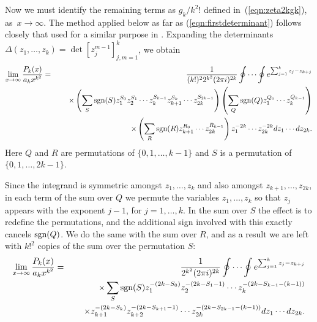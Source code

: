 \documentclass[12pt,letterpaper]{amsart}
\theoremstyle{plain}
\theoremstyle{definition}
\theoremstyle{remark}
\numberwithin{equation}{subsection}
\numberwithin{theorem}{subsection}
\numberwithin{table}{subsection}
\def\sgn{\hbox{sgn}}
\begin{document}
Now we must identify the remaining terms as
$g_k/k^2 !$ defined in~(\ref{eqn:zeta2kgk}), as~$x\to\infty$.
The method applied below as far as (\ref{eqn:firstdeterminant})
follows closely that used for a similar purpose in \cite{BH}.
Expanding the determinants
$\Delta(z_1,\ldots,z_k)=\det[z_j^{m-1}]_{j,m=1}^k$, we obtain
\begin{eqnarray}
\lim_{x\rightarrow \infty}\frac{P_k(x)}{a_k{x}^{k^2}}&  =
&\frac{1} {(k!)^2 2^{k^2} (2\pi i)^{2k}} \oint \cdots  \oint
e^{\sum_{j=1}^k z_j-z_{k+j}} \nonumber \\&   &\ \ \ \ \times\left(
\sum_S \sgn(S) z_1^{S_0}z_2^{S_1} \cdots z_k^{S_{k-1}}
z_{k+1}^{S_k} \cdots z_{2k}^{S_{2k-1}} \right) \left( \sum_Q
\sgn(Q) z_1^{Q_0}\cdots z_k^{Q_{k-1}} \right)\nonumber \\&   &\ \
\ \ \times\left( \sum_R \sgn(R) z_{k+1}^{R_0}\cdots
z_{2k}^{R_{k-1}} \right) z_1^{-2k}\cdots z_{2k}^{-2k} dz_1\cdots
dz_{2k}.
\end{eqnarray}
Here $Q$ and $R$ are permutations of $\{0,1,\ldots,k-1\}$ and
$S$ is a permutation of $\{0,1,\ldots,2k-1\}$.

Since the integrand is symmetric amongst $z_1,\ldots,z_k$ and also
amongst $z_{k+1},\ldots,z_{2k}$, in each term of the sum over $Q$
we permute the variables $z_1,\ldots,z_k$ so that $z_j$ appears
with the exponent $j-1$, for $j=1,\ldots, k$.  In the sum over $S$
the effect is to redefine the permutations, and the additional
sign involved with this exactly cancels $\sgn(Q)$.  We do the same
with the sum over $R$, and as a result we are left with $k!^2$
copies of the sum over the permutation $S$:
\begin{eqnarray}
\label{eqn:lastintegral}
 \lim_{x\rightarrow
\infty}\frac{P_k(x)}{a_k {x}^{k^2}}& = &\frac{1} {2^{k^2} (2\pi
i)^{2k}} \oint \cdots  \oint e^{\sum_{j=1}^k z_j-z_{k+j}}\nonumber
\\&   &\ \ \ \  \times\sum_S \sgn(S) z_1^{-(2k-S_0)}
z_2^{-(2k-S_1-1)} \cdots z_k^{-(2k-S_{k-1}-(k-1))}\nonumber \\&
&\ \ \ \ \times z_{k+1}^{-(2k-S_k)} z_{k+2}^{-(2k-S_{k+1}-1)}
\cdots z_{2k}^{-(2k-S_{2k-1}-(k-1))} dz_1\cdots dz_{2k}.
\end{eqnarray}
\end{document}
